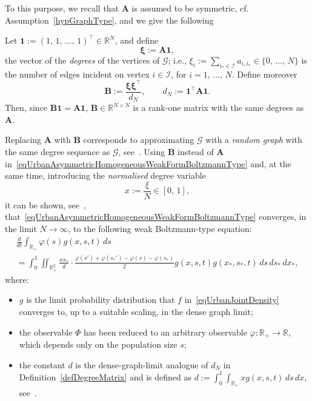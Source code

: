 \documentclass[a4paper]{article}
\newcommand{\R}{\mathbb{R}}
\begin{document}
To this purpose, we recall that $\mathbf A$ is assumed to be symmetric, cf. Assumption~\ref{hypGraphType}, and we give the following
\begin{dfn} \label{defDegreeMatrix}
Let $\mathbf{1}:=(1,\,1,\,\dots,\,1)^\top\in\R^N$, and define
$$ \boldsymbol{\xi}:=\mathbf{A}\mathbf{1}, $$
the vector of the \emph{degrees} of the vertices of $\mathcal G$; i.e., $\xi_i:=\sum_{i_\ast\in\mathcal I}a_{i,i_\ast}\in\{0,\,\dots,\,N\}$ is the number of edges incident on vertex $i\in\mathcal I$, for $i=1,\,\dots,\,N$. Define moreover
$$ \mathbf{B}:=\frac{\boldsymbol{\xi}\boldsymbol{\xi}^\top}{d_N}, \qquad d_N:=\mathbf{1}^\top\mathbf{A}\mathbf{1}. $$
Then, since $\mathbf{B}\mathbf{1}=\mathbf{A}\mathbf{1}$, $\mathbf{B}\in\R^{N\times N}$ is a rank-one matrix with the same degrees as $\mathbf{A}$.
\end{dfn}

Replacing $\mathbf A$ with $\mathbf B$ corresponds to approximating $\mathcal G$ with a \textit{random graph} with the same degree sequence as $\mathcal G$, see~\cite{bollobas1980EJC,molloy1995RSA}. Using $\mathbf B$ instead of $\mathbf A$ in~\eqref{eqUrbanAsymmetricHomogeneousWeakFormBoltzmannType} and, at the same time, introducing the \textit{normalised} degree variable
$$ x:=\frac{\xi}{N}\in [0,\,1], $$
it can be shown, see~\cite{Nurisso2024,taricco2026PREPRINT}, that~\eqref{eqUrbanAsymmetricHomogeneousWeakFormBoltzmannType} converges, in the limit $N\to\infty$, to the following weak Boltzmann-type equation:
\begin{multline}
    \frac{d}{dt}\int_{\R_+}\varphi(s)g(x,s,t)\,ds \\
    =\int_0^1\iint_{\R_+^2}\frac{x x_\ast}{d}\cdot\frac{\varphi(s')+\varphi(s_\ast')-\varphi(s)-\varphi(s_\ast)}{2}
        g(x,s,t)g(x_\ast,s_\ast,t)\,ds\,ds_\ast\,dx_\ast,
    \label{eqRelaxedGraphBoltzmannType}
\end{multline}
where:
\begin{itemize}
\item $g$ is the limit probability distribution that $f$ in~\eqref{eqUrbanJointDensity} converges to, up to a suitable scaling, in the dense graph limit;
\item the observable $\Phi$ has been reduced to an arbitrary observable $\varphi:\R_+\to\R$, which depends only on the population size $s$;
\item the constant $d$ is the dense-graph-limit analogue of $d_N$ in Definition~\ref{defDegreeMatrix} and is defined as $d:=\int_0^1\int_{\R_+}xg(x,s,t)\,ds\,dx$, see~\cite{Nurisso2024}.
\end{itemize}
\end{document}
